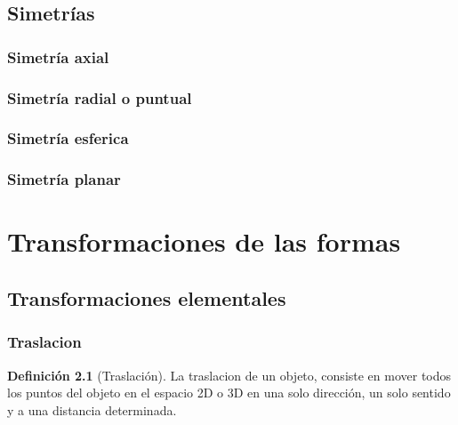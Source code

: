\documentclass[
  16pt,
]{krantz}
\theoremstyle{definition}
\newtheorem{definition}{Definición}[chapter]
\theoremstyle{definition}
\theoremstyle{definition}
\theoremstyle{definition}
\theoremstyle{remark}
\begin{document}
\hypertarget{simetruxedas}{%
\section{Simetrías}\label{simetruxedas}}

\hypertarget{simetruxeda-axial}{%
\subsection{Simetría axial}\label{simetruxeda-axial}}

\hypertarget{simetruxeda-radial-o-puntual}{%
\subsection{Simetría radial o puntual}\label{simetruxeda-radial-o-puntual}}

\hypertarget{simetruxeda-esferica}{%
\subsection{Simetría esferica}\label{simetruxeda-esferica}}

\hypertarget{simetruxeda-planar}{%
\subsection{Simetría planar}\label{simetruxeda-planar}}

\hypertarget{transformaciones-de-las-formas}{%
\chapter{Transformaciones de las formas}\label{transformaciones-de-las-formas}}

\hypertarget{transformaciones-elementales}{%
\section{Transformaciones elementales}\label{transformaciones-elementales}}

\hypertarget{traslacion}{%
\subsection{Traslacion}\label{traslacion}}

\begin{definition}[Traslación]
\protect\hypertarget{def:traslacion}{}{\label{def:traslacion} {} }La traslacion de un objeto, consiste en mover todos los puntos del objeto en el espacio 2D o 3D en una solo dirección, un solo sentido y a una distancia determinada.
\end{definition}
\end{document}

